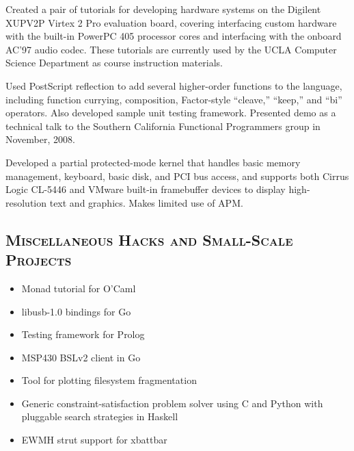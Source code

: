 \begin{resume}
\begin{position}
  Created a pair of tutorials for developing hardware systems on the
  Digilent XUPV2P Virtex 2 Pro evaluation board, covering interfacing
  custom hardware with the built-in PowerPC 405 processor cores and
  interfacing with the onboard AC’97 audio codec.  These tutorials are
  currently used by the UCLA Computer Science Department as course
  instruction materials.
\end{position}

\begin{position}
  Used PostScript reflection to add several higher-order functions to
  the language, including function currying, composition, Factor-style
  ``cleave,'' ``keep,'' and ``bi'' operators.  Also developed sample
  unit testing framework.  Presented demo as a technical talk to the
  Southern California Functional Programmers group in November, 2008.
\end{position}

\begin{position}
  Developed a partial protected-mode kernel that handles basic memory
  management, keyboard, basic disk, and PCI bus access, and supports
  both Cirrus Logic CL-5446 and VMware built-in framebuffer devices to
  display high-resolution text and graphics.  Makes limited use of
  APM.
\end{position}

\subsection{\textsc{Miscellaneous Hacks and Small-Scale Projects}}
\begin{itemize}
\item Monad tutorial for O’Caml
\item libusb-1.0 bindings for Go
\item Testing framework for Prolog
\item MSP430 BSLv2 client in Go
\item Tool for plotting filesystem fragmentation
\item Generic constraint-satisfaction problem solver using C and
  Python with pluggable search strategies in Haskell
\item EWMH strut support for xbattbar
\end{itemize}


\end{resume}
